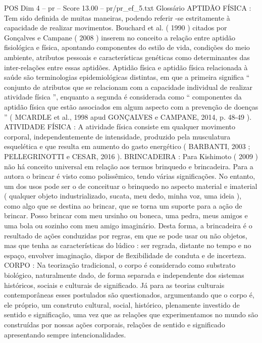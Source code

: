 \begin{textsample}{POS Dim 4 – pr – Score 13.00 – pr/pr\_ef\_5.txt}  \label{ex:f4_pos_182}
Glossário APTIDÃO FÍSICA : Tem sido definida de muitas maneiras, podendo referir -se estritamente à capacidade de realizar movimentos.
Bouchard et al. ( 1990 ) citados por Gonçalves e Campane ( 2008 ) inserem no conceito a relação entre aptidão fisiológica e física, apontando componentes do estilo de vida, condições do meio ambiente, atributos pessoais e características genéticas como determinantes das inter-relações entre essas aptidões.
Aptidão física e aptidão física relacionada à saúde são terminologias epidemiológicas distintas, em que a primeira significa “ conjunto de atributos que se relacionam com a capacidade individual de realizar atividade física ”, enquanto a segunda é considerada como “ componentes da aptidão física que estão associados em algum aspecto com a prevenção de doenças ” ( MCARDLE et al., 1998 apud GONÇALVES e CAMPANE, 2014, p. 48-49 ).
ATIVIDADE FÍSICA : A atividade física consiste em qualquer movimento corporal, independentemente de intensidade, produzido pela musculatura esquelética e que resulta em aumento do gasto energético ( BARBANTI, 2003 ; PELLEGRINOTTI e CESAR, 2016 ).
BRINCADEIRA : Para Kishimoto ( 2009 ) não há conceito universal em relação aos termos brinquedo e brincadeira.
Para a autora o brincar é visto como polissêmico, tendo várias significações.
No entanto, um dos usos pode ser o de conceituar o brinquedo no aspecto material e imaterial ( qualquer objeto industrializado, sucata, meu dedo, minha voz, uma ideia ), como algo que se destina ao brincar, que se torna um suporte para a ação de brincar.
Posso brincar com meu ursinho ou boneca, uma pedra, meus amigos e uma bola ou sozinho com meu amigo imaginário.
Desta forma, a brincadeira é o resultado de ações conduzidas por regras, em que se pode usar ou não objetos, mas que tenha as características do lúdico : ser regrada, distante no tempo e no espaço, envolver imaginação, dispor de flexibilidade de conduta e de incerteza.
CORPO : Na teorização tradicional, o corpo é considerado como substrato biológico, naturalmente dado, de forma separada e independente dos sistemas históricos, sociais e culturais de significado.
Já para as teorias culturais contemporâneas esses postulados são questionados, argumentando que o corpo é, ele próprio, um construto cultural, social, histórico, plenamente investido de sentido e significação, uma vez que as relações que experimentamos no mundo são construídas por nossas ações corporais, relações de sentido e significado apresentando sempre intencionalidades.

\end{textsample}
